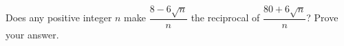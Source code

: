 Does any positive integer $n$ make $\dfrac{8-6\sqrt n}{n}$ the reciprocal of $\dfrac{80+6\sqrt n}{n}$? Prove your answer.
